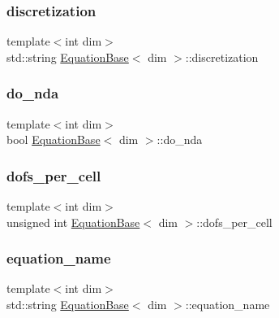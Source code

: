 \subsubsection{\texorpdfstring{discretization}{discretization}}
{\footnotesize\ttfamily template$<$int dim$>$ \\
std\+::string \hyperlink{class_equation_base}{Equation\+Base}$<$ dim $>$\+::discretization\hspace{0.3cm}{\ttfamily [protected]}}

\mbox{\label{class_equation_base_a908f21db148a15d7d51a8508aa1fc58a}} 
\subsubsection{\texorpdfstring{do\+\_\+nda}{do\_nda}}
{\footnotesize\ttfamily template$<$int dim$>$ \\
bool \hyperlink{class_equation_base}{Equation\+Base}$<$ dim $>$\+::do\+\_\+nda\hspace{0.3cm}{\ttfamily [protected]}}

\mbox{\label{class_equation_base_a66b4cac3e416505fba70789599a98d14}} 
\subsubsection{\texorpdfstring{dofs\+\_\+per\+\_\+cell}{dofs\_per\_cell}}
{\footnotesize\ttfamily template$<$int dim$>$ \\
unsigned int \hyperlink{class_equation_base}{Equation\+Base}$<$ dim $>$\+::dofs\+\_\+per\+\_\+cell\hspace{0.3cm}{\ttfamily [protected]}}

\mbox{\label{class_equation_base_a0a72472959e531f5256400dec911f3a5}} 
\subsubsection{\texorpdfstring{equation\+\_\+name}{equation\_name}}
{\footnotesize\ttfamily template$<$int dim$>$ \\
std\+::string \hyperlink{class_equation_base}{Equation\+Base}$<$ dim $>$\+::equation\+\_\+name\hspace{0.3cm}{\ttfamily [protected]}}

